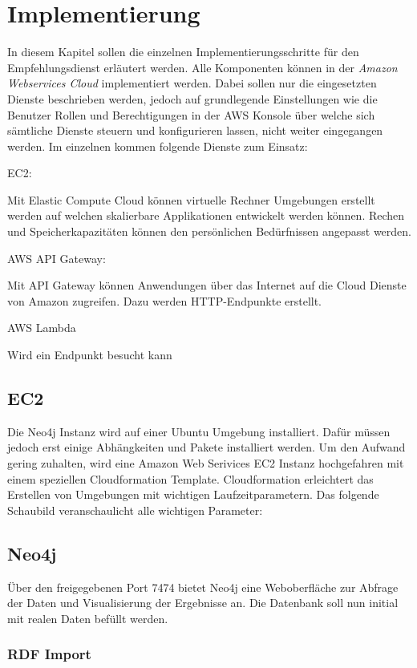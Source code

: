 \section{Implementierung}\label{implementaion}

 In diesem Kapitel sollen die einzelnen Implementierungsschritte für den Empfehlungsdienst erläutert werden. Alle Komponenten können in der \textit{Amazon Webservices Cloud} implementiert werden. Dabei sollen nur die eingesetzten Dienste beschrieben werden, jedoch auf grundlegende Einstellungen wie die Benutzer Rollen und Berechtigungen in der AWS Konsole über welche sich sämtliche Dienste steuern und konfigurieren lassen, nicht weiter eingegangen werden. Im einzelnen kommen folgende Dienste zum Einsatz:

EC2:

Mit Elastic Compute Cloud können virtuelle Rechner Umgebungen erstellt werden auf welchen skalierbare Applikationen entwickelt werden können. Rechen und Speicherkapazitäten können den persönlichen Bedürfnissen angepasst werden. 

AWS API Gateway:

Mit API Gateway können Anwendungen über das Internet auf die Cloud Dienste von Amazon zugreifen. Dazu werden HTTP-Endpunkte erstellt.

AWS Lambda

Wird ein Endpunkt besucht kann 
   \subsection{EC2 }

Die Neo4j Instanz wird auf einer Ubuntu Umgebung installiert. Dafür müssen jedoch erst einige Abhängkeiten und Pakete installiert werden. Um den Aufwand gering zuhalten, wird eine Amazon Web Serivices EC2 Instanz hochgefahren mit einem speziellen Cloudformation Template. Cloudformation erleichtert das Erstellen von Umgebungen mit wichtigen Laufzeitparametern. Das folgende Schaubild veranschaulicht alle wichtigen Parameter:

\subsection{Neo4j}

Über den freigegebenen Port 7474 bietet Neo4j eine Weboberfläche zur Abfrage der Daten und Visualisierung der Ergebnisse an. Die Datenbank soll nun initial mit realen Daten befüllt werden. 

\subsubsection{RDF Import}

